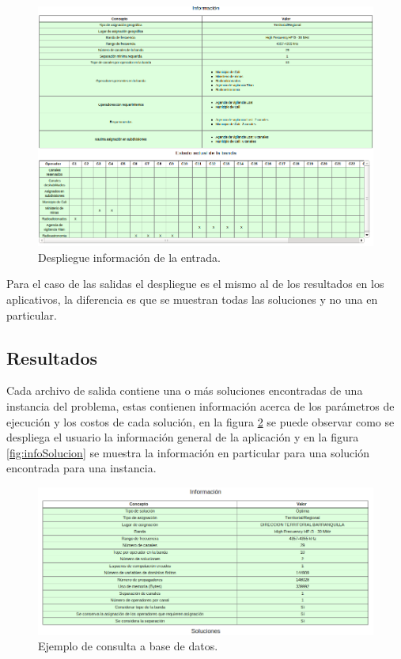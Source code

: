\begin{figure}[H]
	\centering
	\includegraphics[width=14cm]{Capitulo8InterfacesWeb/Imagenes/Entrada.png}
	\caption{Despliegue información de la entrada.}
	\label{fig:consultaEntrada}	
\end{figure}

Para el caso de las salidas el despliegue es el mismo al de los resultados en los aplicativos, la diferencia es que se muestran todas las soluciones y no una en particular.

\subsection{Resultados}

Cada archivo de salida contiene una o más soluciones encontradas de una instancia del problema, estas contienen información acerca de los parámetros de ejecución y los costos de cada solución, en la figura \ref{fig:infoGeneral} se puede observar como se despliega el usuario la información general de la aplicación y en la figura \ref{fig:infoSolucion} se muestra la información en particular para una solución encontrada para una instancia.

\begin{figure}[H]
	\centering
	\includegraphics[width=15cm]{Capitulo8InterfacesWeb/Imagenes/InformacionGeneral.png}
	\caption{Ejemplo de consulta a base de datos.}
	\label{fig:infoGeneral}	
\end{figure}

